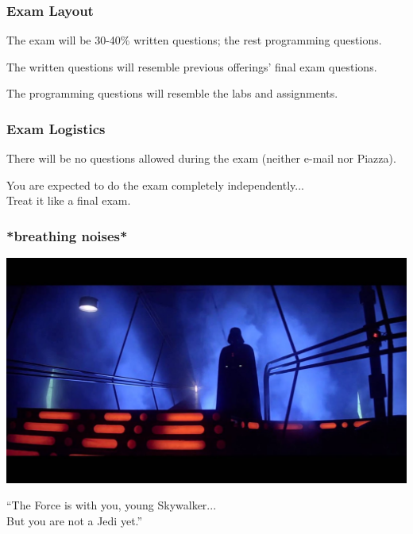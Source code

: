 \begin{frame}
\frametitle{Exam Layout}

The exam will be 30-40\% written questions; the rest programming questions.

The written questions will resemble previous offerings' final exam questions.

The programming questions will resemble the labs and assignments.

\end{frame}


\begin{frame}
\frametitle{Exam Logistics}

There will be no questions allowed during the exam (neither e-mail nor Piazza).

You are expected to do the exam completely independently...\\
\quad Treat it like a final exam.


\end{frame}



\begin{frame}
\frametitle{*breathing noises*}

\begin{center}
	\includegraphics[width=\textwidth]{images/vader.jpg}
\end{center}

``The Force is with you, young Skywalker...\\
\quad But you are not a Jedi yet.''


\end{frame}




